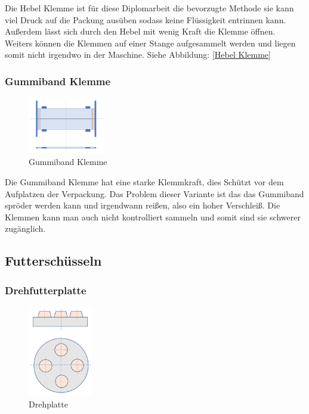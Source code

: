 Die Hebel Klemme ist für diese Diplomarbeit die bevorzugte Methode sie kann viel Druck auf die Packung ausüben sodass keine Flüssigkeit entrinnen kann. Außerdem lässt sich durch den Hebel mit wenig Kraft die Klemme öffnen. Weiters können die Klemmen auf einer Stange aufgesammelt werden und liegen somit nicht irgendwo in der Maschine. Siehe Abbildung:    
 \ref{Hebel Klemme}
\vspace{+40pt}

\subsubsection{Gummiband Klemme}
 
\begin{figure}
\vspace{-40pt}
  \begin{center}
    \includegraphics[width=0.30\textwidth]{Bilder/Powerpoint/Gummiband_Klemme}
  \end{center}
  \caption{Gummiband Klemme}
  \label{Gummiband Klemme}
  \vspace{-20pt}
\end{figure}

Die Gummiband Klemme hat eine starke Klemmkraft, dies Schützt vor dem Aufplatzen der Verpackung. Das Problem dieser Variante ist das das Gummiband spröder werden kann und irgendwann reißen, also ein hoher Verschleiß. Die Klemmen kann man auch nicht kontrolliert sammeln und somit sind sie schwerer zugänglich.

\subsection{Futterschüsseln}

\subsubsection{Drehfutterplatte}

\begin{figure}
\vspace{-40pt}
  \begin{center}
    \includegraphics[width=0.25\textwidth]{Bilder/Powerpoint/Drehplatte}
  \end{center}
  \caption{Drehplatte}
  \label{Drehplatte}
  \vspace{-20pt}
\end{figure}

